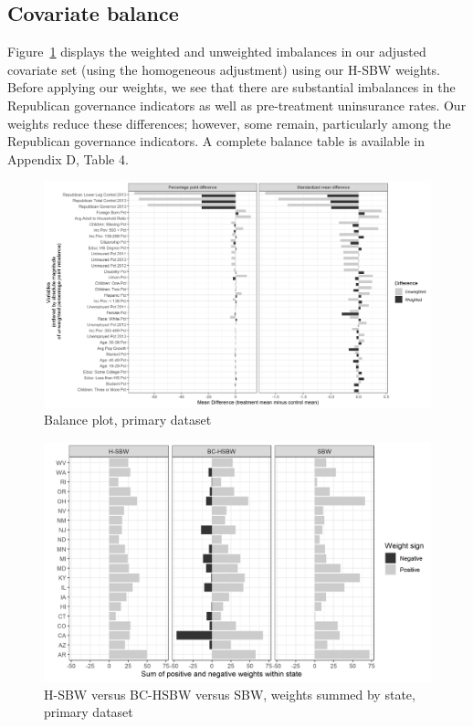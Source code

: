 \documentclass[aoas]{imsart}
\theoremstyle{plain}
\theoremstyle{remark}
\begin{document}
\subsection{Covariate balance}

Figure~\ref{fig:loveplotc1} displays the weighted and unweighted imbalances in our adjusted covariate set (using the homogeneous adjustment) using our H-SBW weights. Before applying our weights, we see that there are substantial imbalances in the Republican governance indicators as well as pre-treatment uninsurance rates. Our weights reduce these differences; however, some remain, particularly among the Republican governance indicators. A complete balance table is available in Appendix D, Table 4. 

\begin{figure}[H]
\begin{center}
    \caption{Balance plot, primary dataset}
    \label{fig:loveplotc1}
    \includegraphics[scale=0.5]{01_Plots/balance-plot-all-etuc1.png}
\end{center}
\end{figure}

\begin{figure}[H]
\begin{center}
    \caption{H-SBW versus BC-HSBW versus SBW, weights summed by state, primary dataset}
    \label{fig:sbwvhsbw1}
    \includegraphics[scale=0.6]{01_Plots/weights-by-state-sbw-hsbw-c1.png}
\end{center}
\end{figure}
\end{document}
